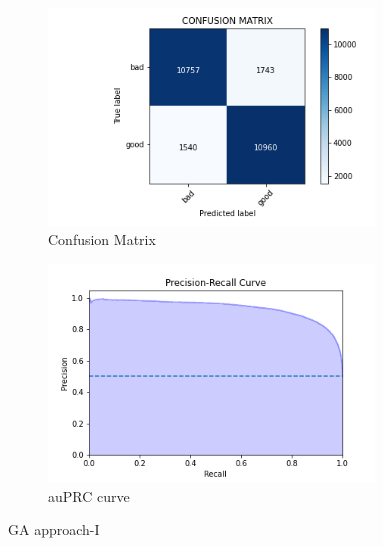 \documentclass[conference]{IEEEtran}
\begin{document}
\begin{figure}[h!]
\centering
\captionsetup{justification=centering}
\begin{subfigure}{0.5\textwidth}
\centering
\includegraphics[width=0.95\textwidth]{genetic/bestmodel/genetic-best-confusion-matrix.png}
\caption{Confusion Matrix}
\end{subfigure}%
\begin{subfigure}{0.5\textwidth}
\centering
\includegraphics[width=0.95\textwidth]{genetic/bestmodel/genetic-best-recision-Recall-Curve.png}
\caption{auPRC curve}
\end{subfigure}%
\caption{GA approach-I}
\end{figure}
\end{document}
